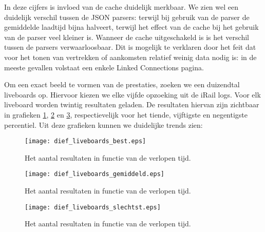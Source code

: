 In deze cijfers is invloed van de cache duidelijk merkbaar. We zien wel een duidelijk verschil tussen de JSON parsers: terwijl bij gebruik van de  parser de gemiddelde laadtijd bijna halveert, terwijl het effect van de cache bij het gebruik van de  parser veel kleiner is. Wanneer de cache uitgeschakeld is is het verschil tussen de parsers verwaarloosbaar. Dit is mogelijk te verklaren door het feit dat voor het tonen van vertrekken of aankomsten relatief weinig data nodig is: in de meeste gevallen volstaat een enkele Linked Connections pagina.

Om een exact beeld te vormen van de prestaties, zoeken we een duizendtal liveboards op. Hiervoor kiezen we elke vijfde opzoeking uit de iRail logs. Voor elk liveboard worden twintig resultaten geladen. De resultaten hiervan zijn zichtbaar in grafieken \ref{fig:liveboardsDiefBest}, \ref{fig:liveboardsDiefAvg} en \ref{fig:liveboardsDiefSlechtst}, respectievelijk voor het tiende, vijftigste en negentigste percentiel. Uit deze grafieken kunnen we duidelijke trends zien:

\begin{figure}[h]
	\centering
	\texttt{[image: dief\_liveboards\_best.eps]}
	\caption[Aantal resultaten liveboards in functie van de tijd]{Het aantal resultaten in functie van de verlopen tijd.}
	\label{fig:liveboardsDiefBest}
\end{figure}

\begin{figure}[h]
	\centering
	\texttt{[image: dief\_liveboards\_gemiddeld.eps]}
	\caption[Aantal resultaten liveboards in functie van de tijd]{Het aantal resultaten in functie van de verlopen tijd.}
	\label{fig:liveboardsDiefAvg}
\end{figure}

\begin{figure}[h]
	\centering
	\texttt{[image: dief\_liveboards\_slechtst.eps]}
	\caption[Aantal resultaten liveboards in functie van de tijd]{Het aantal resultaten in functie van de verlopen tijd.}
	\label{fig:liveboardsDiefSlechtst}
\end{figure}


